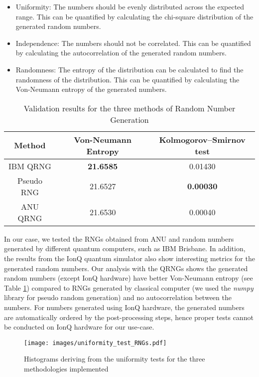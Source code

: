 \documentclass{article}
\begin{document}
\begin{itemize}
\item Uniformity: The numbers should be evenly distributed across the expected range.  This can be quantified by calculating the chi-square distribution of the generated random numbers.  

\item Independence: The numbers should not be correlated. This can be quantified by calculating the autocorrelation of the generated random numbers.

\item Randomness: The entropy of the distribution can be calculated to find the randomness of the distribution.  This can be quantified by calculating the Von-Neumann entropy of the generated numbers.

\end{itemize}

\begin{table}[h]
  \centering
  \begin{tabular}{|c|c|c|}
    \hline
    Method & Von-Neumann Entropy  &Kolmogorov–Smirnov test\\ \hline
    IBM QRNG& \textbf{21.6585} &0.01430\\ \hline
    Pseudo RNG& 21.6527 &\textbf{0.00030}\\ \hline
    ANU QRNG& 21.6530 &0.00040\\ \hline
  \end{tabular}
  \caption{Validation results for the three methods of Random Number Generation}
  \label{tab:entropy}
\end{table}


In our case, we tested the RNGs obtained from ANU and random numbers generated by different quantum computers, such as IBM Brisbane. In addition, the results from the IonQ quantum simulator also show interesting metrics for the generated random numbers.  
Our analysis with the QRNGs shows the generated random numbers (except IonQ hardware) have better Von-Neumann entropy (see Table \ref{tab:entropy}) compared to RNGs generated by classical computer (we used the \textit{numpy} library for pseudo random generation) and no autocorrelation between the numbers.  
For numbers generated using IonQ hardware, the generated numbers are automatically ordered by the post-processing steps, hence proper tests cannot be conducted on IonQ hardware for our use-case. 

\begin{figure}[h]
    \centering
    \begin{adjustbox}{center}
        \texttt{[image: images/uniformity\_test\_RNGs.pdf]}
    \end{adjustbox}
    \caption{Histograms deriving from the uniformity tests for the three methodologies implemented}
    \label{fig:uniformity_test}
\end{figure}
\end{document}
